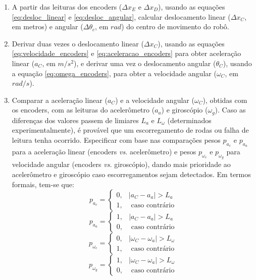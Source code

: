 \begin{enumerate}
  \item A partir das leituras dos encoders ($\Delta x_E$ e $\Delta x_D$), usando as equações \ref{eq:desloc_linear} e \ref{eq:desloc_angular}, calcular deslocamento linear ($\Delta x_C$, em metros) e angular ($\Delta \theta_c$, em $rad$) do centro de movimento do robô.
  
  \item Derivar duas vezes o deslocamento linear ($\Delta x_C$), usando as equações \ref{eq:velocidade_encoders} e \ref{eq:aceleracao_encoders} para obter aceleração linear ($a_C$, em $m/s^2$), e derivar uma vez o deslocamento angular ($\theta_C$), usando a equação \ref{eq:omega_encoders}, para obter a velocidade angular ($\omega_C$, em $rad/s$).
  
  \item Comparar a aceleração linear ($a_C$) e a velocidade angular ($\omega_C$), obtidas com os encoders, com as leituras do acelerômetro ($a_a$) e giroscópio ($\omega_g$). Caso as diferenças dos valores passem de limiares $L_a$ e $L_\omega$ (determinados experimentalmente), é provável que um escorregamento de rodas ou falha de leitura tenha ocorrido. Especificar com base nas comparações pesos $p_{a_c}$ e $p_{a_a}$ para a aceleração linear (encoders \textit{vs.} acelerômetro) e pesos $p_{\omega_c}$ e $p_{\omega_g}$ para velocidade angular (encoders \textit{vs.} giroscópio), dando mais prioridade ao acelerômetro e giroscópio caso escorregamentos sejam detectados. Em termos formais, tem-se que:
  \label{item:pesos}
  \[
  p_{a_c} =  
  \begin{cases}
      0, & |a_C - a_a| > L_a \\
      1, & \mbox{ caso contrário} 
      \label{eq:p_ac}
  \end{cases}
  \]
   \[
  p_{a_a} =  
  \begin{cases}
      1, & |a_C - a_a| > L_a \\
      0, & \mbox{ caso contrário}
      \label{eq:p_ac}
  \end{cases}
  \]
   \[
  p_{\omega_c} =  
  \begin{cases}
      0, & |\omega_C - \omega_a| > L_\omega \\
      1, & \mbox{ caso contrário}
      \label{eq:p_ac}
  \end{cases}
  \]
  \[
  p_{\omega_g} =  
  \begin{cases}
      1, & |\omega_C - \omega_a| > L_\omega \\
      0, & \mbox{ caso contrário}
      \label{eq:p_ac}
  \end{cases}
  \]
  

\end{enumerate}
